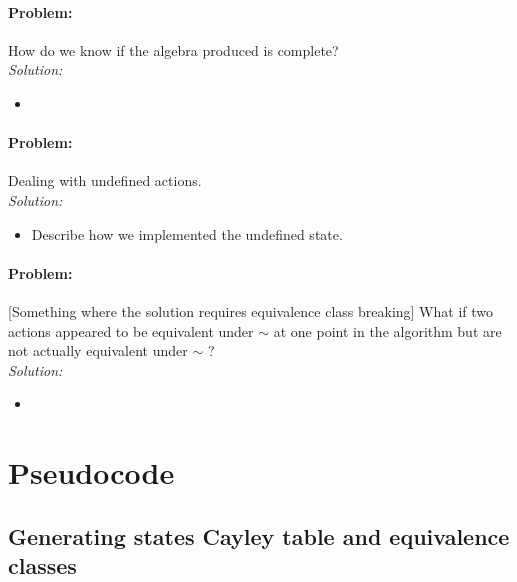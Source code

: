 
\paragraph{Problem:}
How do we know if the algebra produced is complete?
\\\textit{Solution:}
\begin{itemize}
	\item
\end{itemize}


\paragraph{Problem:}
Dealing with undefined actions.
\\\textit{Solution:}
\begin{itemize}
	\item Describe how we implemented the undefined state.
\end{itemize}

\paragraph{Problem:}
[Something where the solution requires equivalence class breaking]
What if two actions appeared to be equivalent under $\sim$ at one point in the algorithm but are not actually equivalent under $\sim$ ?
\\\textit{Solution:}
\begin{itemize}
	\item
\end{itemize}


\section{Pseudocode}

\subsection{Generating states Cayley table and equivalence classes}

